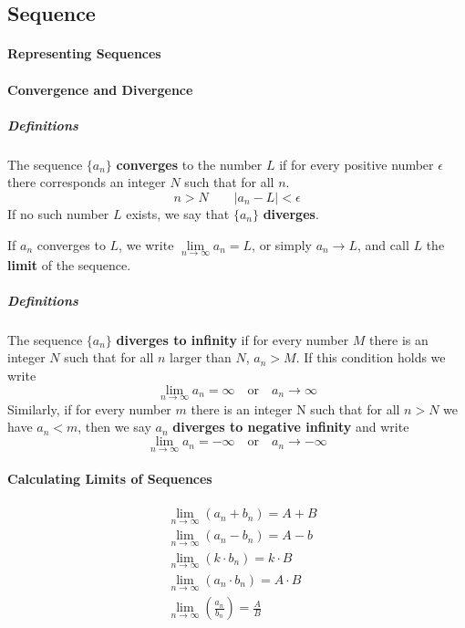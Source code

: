\documentclass{article}
\begin{document}
        \subsection{Sequence}
            \paragraph{Representing Sequences}
            \paragraph{Convergence and Divergence}
                \subparagraph{Definitions} The sequence $\{a_n\}$ \textbf{converges} to the number $L$ if for every positive number $\epsilon$ there corresponds an integer $N$ such that for all $n$.
                \[n>N\quad \quad |a_n-L|<\epsilon\]
                If no such number $L$ exists, we say that $\{a_n\}$ \textbf{diverges}.
                \par If ${a_n}$ converges to $L$, we write $\lim\limits_{n\to\infty}a_n=L$, or simply $a_n\to L$, and call $L$ the \textbf{limit} of the sequence.
                \subparagraph{Definitions} The sequence $\{a_n\}$ \textbf{diverges to infinity} if for every number $M$ there is an integer $N$ such that for all $n$ larger than $N$, $a_n>M$. If this condition holds we write
                \[\lim\limits_{n\to\infty}a_n=\infty\quad \text{or}\quad a_n\to \infty\]
                Similarly, if for every number $m$ there is an integer N such that for all $n>N$ we have $a_n<m$, then we say ${a_n}$ \textbf{diverges to negative infinity} and write
                \[\lim\limits_{n\to\infty}a_n=-\infty\quad\text{or}\quad a_n\to -\infty\]
            \paragraph{Calculating Limits of Sequences}
                \begin{equation}
                    \begin{aligned}
                        &\lim\limits_{n\to\infty}(a_n+b_n)=A+B\\
                        &\lim\limits_{n\to\infty}(a_n-b_n)=A-b\\
                        &\lim\limits_{n\to\infty}(k\cdot b_n)=k\cdot B\\
                        &\lim\limits_{n\to\infty}(a_n\cdot b_n)=A\cdot B\\
                        &\lim\limits_{n\to\infty}(\frac{a_n}{b_n})=\frac{A}{B}\\
                    \end{aligned}
                \end{equation}
\end{document}

